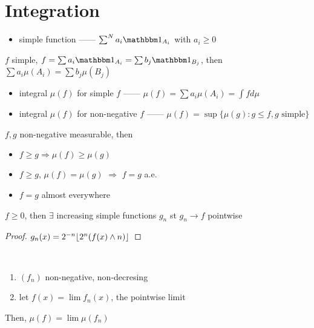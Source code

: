 \section{Integration}\label{sec:integration}

\begin{itemize}
    \item simple function ------ $\sum^N a_i \In_{A_{i}}$ with $a_i \geq 0$
\end{itemize}

\begin{lemma}
   $f$ simple, $f = \sum a_i\In_{A_i} = \sum b_j \In_{B_j}$, then $\sum a_i \mu(A_i) = \sum b_j \mu(B_j)$
\end{lemma}

\begin{itemize}
    \item integral $\mu(f)$ for simple $f$ ------ $\mu(f) = \sum a_i \mu(A_i) = \int f d\mu$
    \item integral $\mu(f)$ for non-negative $f$ ------ $\mu(f) = \sup \{\mu(g) : g \leq f, g \text{ simple}\}$
\end{itemize}

\begin{prop}[positivity]
    $f, g$ non-negative measurable, then
    \begin{itemize}
        \item $f \geq g \Rightarrow \mu(f) \geq \mu(g)$
        \item $f \geq g$, $\mu(f) = \mu(g)$ $\Rightarrow$ $f = g$ a.e.
    \end{itemize}
\end{prop}

\begin{itemize}
    \item $f = g$ almost everywhere
\end{itemize}

\begin{lemma}
    $f \geq 0$, then $\exists$ increasing simple functions $g_n$ st $g_n \rightarrow f$ pointwise 
\end{lemma}

\begin{proof}
    $g_n(x) = 2^{-n}\lfloor2^n(f(x) \wedge n)\rfloor$
\end{proof}

\begin{thm}\,
    \begin{enumerate}
        \item $(f_n)$ non-negative, non-decresing
        \item let $f(x) = \lim f_n(x)$, the pointwise limit
    \end{enumerate}
    Then, $\mu(f) = \lim \mu(f_n)$
\end{thm}

